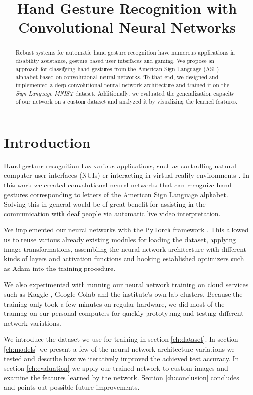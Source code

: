 \documentclass[a4paper]{article}
\title{Hand Gesture Recognition with Convolutional Neural Networks}
\begin{document}
\maketitle
%
\begin{abstract}
Robust systems for automatic hand gesture recognition have numerous applications in disability assistance, gesture-based user interfaces and gaming. We propose an approach for classifying hand gestures from the American Sign Language (ASL) alphabet based on convolutional neural networks. To that end, we designed and implemented a deep convolutional neural network architecture and trained it on the \textit{Sign Language MNIST} dataset. Additionally, we evaluated the generalization capacity of our network on a custom dataset and analyzed it by visualizing the learned features.
\end{abstract}

\section{Introduction}

Hand gesture recognition has various applications, such as controlling natural computer user interfaces (NUIs) \cite{GlueTK} or interacting in virtual reality environments \cite{MicrosoftTalkingHands}. In this work we created convolutional neural networks that can recognize hand gestures corresponding to letters of the American Sign Language alphabet. Solving this in general would be of great benefit for assisting in the communication with deaf people via automatic live video interpretation.

We implemented our neural networks with the PyTorch framework \cite{PyTorch}. This allowed us to reuse various already existing modules for loading the dataset, applying image transformations, assembling the neural network architecture with different kinds of layers and activation functions and hooking established optimizers such as Adam \cite{Kingma2014} into the training procedure.

We also experimented with running our neural network training on cloud services such as Kaggle \cite{Kaggle}, Google Colab \cite{Colab} and the institute's own lab clusters. Because the training only took a few minutes on regular hardware, we did most of the training on our personal computers for quickly prototyping and testing different network variations.

We introduce the dataset we use for training in section \ref{ch:dataset}. In section \ref{ch:models} we present a few of the neural network architecture variations we tested and describe how we iteratively improved the achieved test accuracy. In section \ref{ch:evaluation} we apply our trained network to custom images and examine the features learned by the network. Section \ref{ch:conclusion} concludes and points out possible future improvements.
\end{document}

